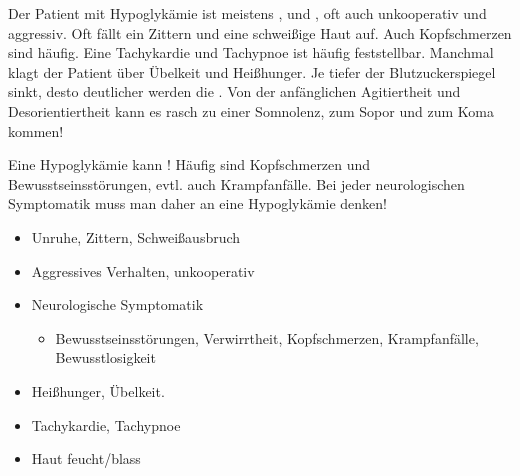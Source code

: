{%
Der Patient mit Hypoglykämie ist meistens ,
 und , oft auch unkooperativ und
aggressiv. Oft fällt ein Zittern und eine schweißige Haut
auf. Auch Kopfschmerzen sind häufig. Eine Tachykardie und
Tachypnoe ist häufig feststellbar. Manchmal klagt der
Patient über Übelkeit und Heißhunger.
Je tiefer der Blutzuckerspiegel sinkt, desto deutlicher
werden die . Von der anfänglichen
Agitiertheit und Desorientiertheit kann es rasch zu einer
Somnolenz, zum Sopor und zum Koma kommen!

Eine Hypoglykämie kann   ! Häufig sind Kopfschmerzen und
Bewusstseinsstörungen, evtl. auch Krampfanfälle. Bei jeder
neurologischen Symptomatik muss man daher an eine
Hypoglykämie denken!
}{
\begin{itemize}
  \item Unruhe, Zittern, Schweißausbruch
  \item Aggressives Verhalten, unkooperativ
  \item Neurologische Symptomatik
  \begin{itemize}
    \item Bewusstseinsstörungen, Verwirrtheit, Kopfschmerzen, Krampfanfälle,
    Bewusstlosigkeit
  \end{itemize}
  \item Heißhunger, Übelkeit.
  \item Tachykardie, Tachypnoe
  \item Haut feucht/blass
\end{itemize}
}{}{}{}












